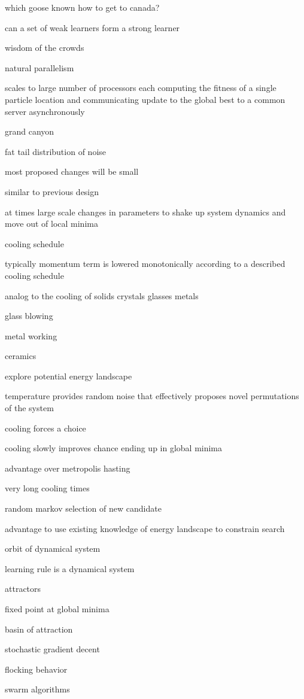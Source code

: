 \documentclass[8pt,journal,compsoc]{IEEEtran}
\begin{document}
which goose known how to get to canada?

can a set of weak learners form a strong learner

wisdom of the crowds

natural parallelism 

scales to large number of processors each computing the fitness of a single particle location and communicating update to the global best to a common server asynchronously 

grand canyon 

fat tail distribution of noise 

most proposed changes will be small

similar to previous design 
 
at times large scale changes in parameters to shake up system dynamics and move out of local minima 

cooling schedule 

typically momentum term is lowered monotonically according to a described cooling schedule 

analog to the cooling of  solids crystals glasses metals 

glass blowing 

metal working 

ceramics

explore potential energy landscape 

temperature provides random noise that effectively proposes novel permutations of the system 

cooling forces a choice 

cooling slowly improves chance ending up in global minima 

advantage over metropolis hasting 

very long cooling times

random markov selection of new candidate 

advantage to use existing knowledge of energy landscape to constrain search 

orbit of dynamical system 

learning rule is a dynamical system

attractors 

fixed point at global minima 

basin of attraction 

stochastic gradient decent 

flocking behavior 

swarm algorithms 
\end{document}
